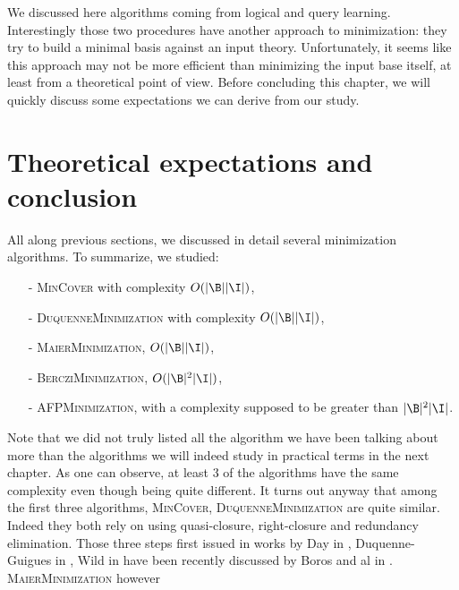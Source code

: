 We discussed here algorithms coming from logical and query learning. Interestingly those two procedures have another approach to minimization: they try to build a minimal basis against an input theory. Unfortunately, it seems
like this approach may not be more efficient than minimizing
the input base itself, at least from a theoretical point of view. Before concluding this chapter, we will quickly discuss some expectations we can 
derive from our study.


\section{Theoretical expectations and conclusion}

All along previous sections, we discussed in detail several minimization
algorithms. To summarize, we studied:
\begin{itemize}
	\item[-] \textsc{MinCover} with complexity $O(|\B||\I|)$,
	\item[-] \textsc{DuquenneMinimization} with complexity $O(|\B||\I|)$,
	\item[-] \textsc{MaierMinimization}, $O(|\B||\I|)$,
	\item[-] \textsc{BercziMinimization}, $O(|\B|^2|\I|)$,
	\item[-] \textsc{AFPMinimization}, with a complexity supposed to be greater than $|\B|^2|\I|$.
\end{itemize}
\noindent Note that we did not truly listed all the algorithm we have been
talking about more than the algorithms we will indeed study in practical terms
in the next chapter. As one can observe, at least 3 of the algorithms have 
the same complexity even though being quite different. It turns out anyway that
among the first three algorithms, \textsc{MinCover, DuquenneMinimization} are
quite similar. Indeed they both rely on using quasi-closure, right-closure and
redundancy elimination. Those three steps first issued in works by Day in \cite{day_lattice_1992}, Duquenne-Guigues in \cite{duquenne_variations_2007, guigues_j.l_familles_1986}, Wild in \cite{wild_theory_1994, wild_computations_1995, wild_implicational_1989} have been recently discussed
by Boros and al in \cite{boros_strong_2017}. \textsc{MaierMinimization} however
